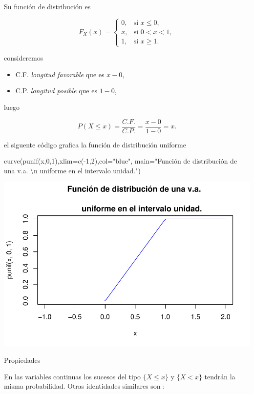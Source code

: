 \documentclass[
  letterpaper,
  DIV=11,
  numbers=noendperiod]{scrreprt}
\newenvironment{Shaded}{\begin{snugshade}}{\end{snugshade}}
\newcommand{\AttributeTok}[1]{\textcolor[rgb]{0.40,0.45,0.13}{#1}}
\newcommand{\DecValTok}[1]{\textcolor[rgb]{0.68,0.00,0.00}{#1}}
\newcommand{\FunctionTok}[1]{\textcolor[rgb]{0.28,0.35,0.67}{#1}}
\newcommand{\NormalTok}[1]{\textcolor[rgb]{0.00,0.23,0.31}{#1}}
\newcommand{\SpecialCharTok}[1]{\textcolor[rgb]{0.37,0.37,0.37}{#1}}
\newcommand{\StringTok}[1]{\textcolor[rgb]{0.13,0.47,0.30}{#1}}
\providecommand{\tightlist}{%
  \setlength{\itemsep}{0pt}\setlength{\parskip}{0pt}}\usepackage{longtable,booktabs,array}
\begin{document}
Su función de distribución es

\[
F_{X}(x)=
\left\{
\begin{array}{ll}
0, & \mbox{si } x\leq 0,\\
x, & \mbox{si } 0<x<1,\\
1, & \mbox{si } x\geq 1.
\end{array}
\right.
\]

consideremos

\begin{itemize}
\tightlist
\item
  C.F. \emph{longitud favorable} que es \(x-0\),
\item
  C.P. \emph{longitud posible} que es \(1-0\),
\end{itemize}

luego

\[P(X\leq x)=\frac{C.F.}{C.P.}=\frac{x-0}{1-0}=x.\]

el siguente código grafica la función de distribución uniforme

\begin{Shaded}
\begin{Highlighting}[]
\FunctionTok{curve}\NormalTok{(}\FunctionTok{punif}\NormalTok{(x,}\DecValTok{0}\NormalTok{,}\DecValTok{1}\NormalTok{),}\AttributeTok{xlim=}\FunctionTok{c}\NormalTok{(}\SpecialCharTok{{-}}\DecValTok{1}\NormalTok{,}\DecValTok{2}\NormalTok{),}\AttributeTok{col=}\StringTok{"blue"}\NormalTok{,}
      \AttributeTok{main=}\StringTok{"Función de distribución de una v.a. }\SpecialCharTok{\textbackslash{}n}
\StringTok{      uniforme en el intervalo unidad."}\NormalTok{)}
\end{Highlighting}
\end{Shaded}

\begin{center}
\includegraphics[width=0.45\linewidth,height=\textheight,keepaspectratio]{variables_aleatorias_files/figure-pdf/figUNIF-1.pdf}
\end{center}

Propiedades

En las variables continuas los sucesos del tipo \(\{X\leq x \}\) y
\(\{X< x \}\) tendrán la misma probabilidad. Otras identidades similares
son :
\end{document}
